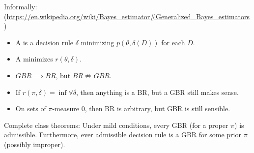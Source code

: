 \begin{tcolorbox}
    Informally: (\url{https://en.wikipedia.org/wiki/Bayes_estimator#Generalized_Bayes_estimators})
    
    \begin{itemize}
        \item A  is a decision rule $\delta$ minimizing $p(\theta, \delta(D))$ for each $D$.
        \item A  minimizes $r(\theta, \delta)$.
        \item $GBR \implies BR$, but $BR \nRightarrow GBR$.
        \item If $r(\pi, \delta) = \inf \forall \delta$, then anything is a BR, but a GBR still makes sense.
        \item On sets of $\pi$-measure $0$, then BR is arbitrary, but GBR is still sensible.
    \end{itemize}
\end{tcolorbox}

Complete class theorems: Under mild conditions, every GBR (for a proper $\pi$) is admissible. Furthermore, ever admissible decision rule is a GBR for some prior $\pi$ (possibly improper).